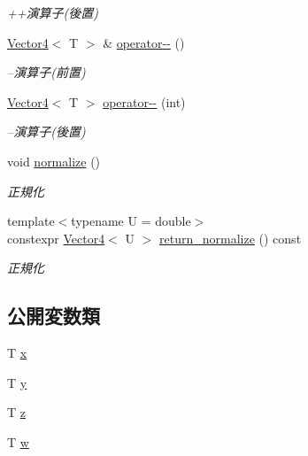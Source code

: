 \begin{DoxyCompactItemize}
\begin{DoxyCompactList}\small\item\em ++演算子(後置) \end{DoxyCompactList}\item 
\mbox{\hyperlink{classsaki_1_1_vector4}{Vector4}}$<$ T $>$ \& \mbox{\hyperlink{classsaki_1_1_vector4_a26f03e4315ec445ace85fe889029f3eb}{operator-\/-\/}} ()
\begin{DoxyCompactList}\small\item\em --演算子(前置) \end{DoxyCompactList}\item 
\mbox{\hyperlink{classsaki_1_1_vector4}{Vector4}}$<$ T $>$ \mbox{\hyperlink{classsaki_1_1_vector4_a4c92f3d34650bdd0c29729c6316cafc1}{operator-\/-\/}} (int)
\begin{DoxyCompactList}\small\item\em --演算子(後置) \end{DoxyCompactList}\item 
void \mbox{\hyperlink{classsaki_1_1_vector4_a0dffdb9814b980692e096cfca3438665}{normalize}} ()
\begin{DoxyCompactList}\small\item\em 正規化 \end{DoxyCompactList}\item 
{\footnotesize template$<$typename U  = double$>$ }\\constexpr \mbox{\hyperlink{classsaki_1_1_vector4}{Vector4}}$<$ U $>$ \mbox{\hyperlink{classsaki_1_1_vector4_a1d02e0290384d777fe51b8d89f175f78}{return\+\_\+normalize}} () const
\begin{DoxyCompactList}\small\item\em 正規化 \end{DoxyCompactList}\end{DoxyCompactItemize}
\subsection*{公開変数類}
\begin{DoxyCompactItemize}
\item 
T \mbox{\hyperlink{classsaki_1_1_vector4_a601546b2852aaf7653bf48308d9f8925}{x}}
\item 
T \mbox{\hyperlink{classsaki_1_1_vector4_a235e5764e2932caedffb0eb924b6f5b9}{y}}
\item 
T \mbox{\hyperlink{classsaki_1_1_vector4_ac3364f312a32b272d81999f68e49c41c}{z}}
\item 
T \mbox{\hyperlink{classsaki_1_1_vector4_a626a70f13cca824eae75e80cb1179b1b}{w}}
\end{DoxyCompactItemize}



